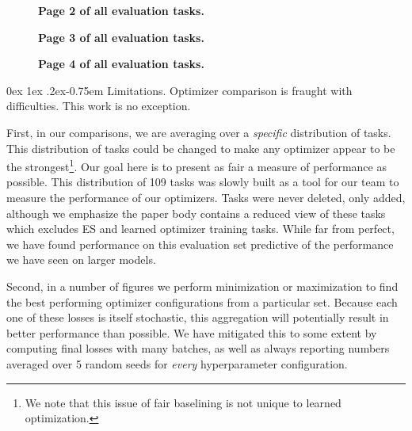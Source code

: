 \documentclass[11pt]{article}
\makeatletter
\renewcommand{\paragraph}{%
  \@startsection{paragraph}{4}%
  {\z@}{0ex \@plus 1ex \@minus .2ex}{-0.75em}%
  {\normalfont\normalsize\bfseries}%
}
\makeatother
\begin{document}
\begin{figure}[h!]
    \centering
    
    \caption{\textbf{Page 2 of all evaluation tasks.} \label{fig:learning_curves_2}
    }
\end{figure}

\begin{figure}[h!]
    \centering
    
    \caption{\textbf{Page 3 of all evaluation tasks.} \label{fig:learning_curves_3}
    }
\end{figure}

\begin{figure}[h!]
    \centering
    
    \caption{\textbf{Page 4 of all evaluation tasks.} \label{fig:learning_curves_4}
    }
\end{figure}


\paragraph{Limitations.}
Optimizer comparison is fraught with difficulties. This work is no exception.

First, in our comparisons, we are averaging over a \emph{specific} distribution of tasks. This distribution of tasks could be changed to make any optimizer appear to be the strongest\footnote{We note that this issue of fair baselining is not unique to learned optimization.}. Our goal here is to present as fair a measure of performance as possible. This distribution of 109 tasks was slowly built as a tool for our team to measure the performance of our optimizers. Tasks were never deleted, only added, although we emphasize the paper body contains a reduced view of these tasks which excludes ES and learned optimizer training tasks. While far from perfect, we have found performance on this evaluation set predictive of the performance we have seen on larger models.

Second, in a number of figures we perform minimization or maximization to find the best performing optimizer configurations from a particular set. Because each one of these losses is itself stochastic, this aggregation will potentially result in better performance than possible. We have mitigated this to some extent by computing final losses with many batches, as well as always reporting numbers averaged over 5 random seeds for \emph{every} hyperparameter configuration.
\end{document}
